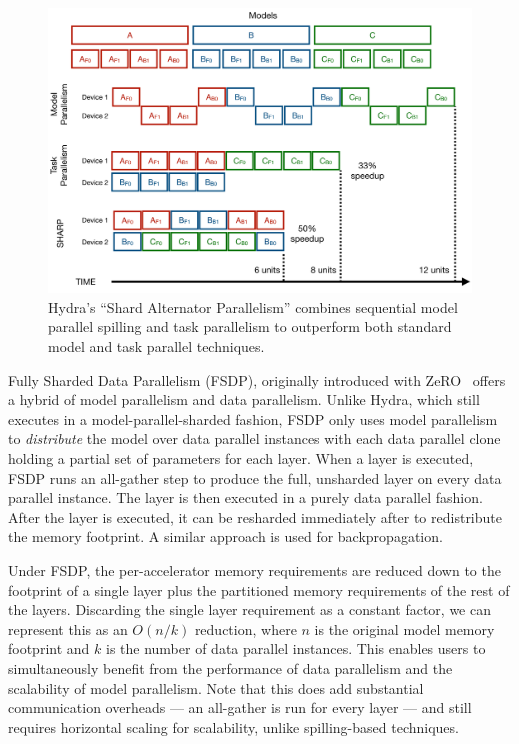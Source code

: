 \begin{figure}[th!]
\centering
	\includegraphics[keepaspectratio=true, width=\linewidth]{images/shard_parallel_schedule}
	\caption{Hydra's ``Shard Alternator Parallelism'' combines sequential model parallel spilling and task parallelism to outperform both standard model and task parallel techniques.}
	\label{fig:shard_parallel}
\end{figure}

Fully Sharded Data Parallelism (FSDP), originally introduced with ZeRO~\cite{zero2019} offers a hybrid of model parallelism and data parallelism. Unlike Hydra, which still executes in a model-parallel-sharded fashion, FSDP only uses model parallelism to \textit{distribute} the model over data parallel instances with each data parallel clone holding a partial set of parameters for each layer. When a layer is executed, FSDP runs an all-gather step to produce the full, unsharded layer on every data parallel instance. The layer is then executed in a purely data parallel fashion. After the layer is executed, it can be resharded immediately after to redistribute the memory footprint. A similar approach is used for backpropagation.



Under FSDP, the per-accelerator memory requirements are reduced down to the footprint of a single layer plus the partitioned memory requirements of the rest of the layers. Discarding the single layer requirement as a constant factor, we can represent this as an $O(n/k)$ reduction, where $n$ is the original model memory footprint and $k$ is the number of data parallel instances. This enables users to simultaneously benefit from the performance of data parallelism and the scalability of model parallelism. Note that this does add substantial communication overheads --- an all-gather is run for every layer --- and still requires horizontal scaling for scalability, unlike spilling-based techniques.

